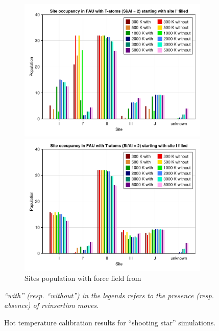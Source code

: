 \documentclass[main.tex]{subfiles}
\begin{document}
\begin{figure}
	\begin{subfigure}{\linewidth}
		\begin{minipage}{0.5\linewidth}
			\centering
			\includegraphics[width=\linewidth]{figures/cations/temperaturecalibration_FAU_T_logicalstart.pdf}
		\end{minipage}\hfill%
		\begin{minipage}{0.5\linewidth}
			\centering
			\includegraphics[width=\linewidth]{figures/cations/temperaturecalibration_FAU_T_absurdstart.pdf}
		\end{minipage}
		\caption{Sites population with force field from \textcite{DiLellaFF}}
	\end{subfigure}

	\caption{Hot temperature calibration results for ``shooting star'' simulations.}\label{fig:temperaturecalibration}
	\textsl{``with'' (resp. ``without'') in the legends refers to the presence (resp. absence) of reinsertion moves.}
\end{figure}
\end{document}

